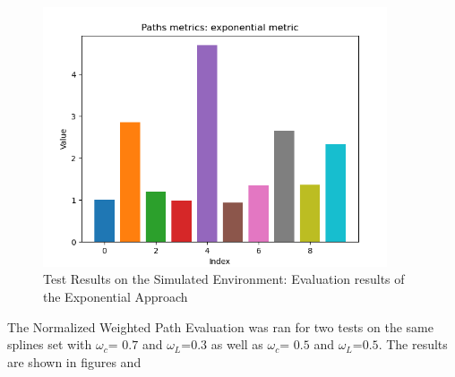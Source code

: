 \begin{figure}[H]
    \begin{center}
        \includegraphics[width=4in]{images/Chap2/Exp_Results.png} %
        \caption{Test Results on the Simulated Environment: Evaluation results of the Exponential Approach}
        \label{Test_Eval_Exp}
        \end{center}    
\end{figure}

The Normalized Weighted Path Evaluation was ran for two tests on the same splines set with 
\(\omega_c\)= \(0.7\) and \(\omega_L\)=\(0.3\) as well as 
\(\omega_c\)= \(0.5\) and \(\omega_L\)=\(0.5\). 
The results are shown in figures  and 

